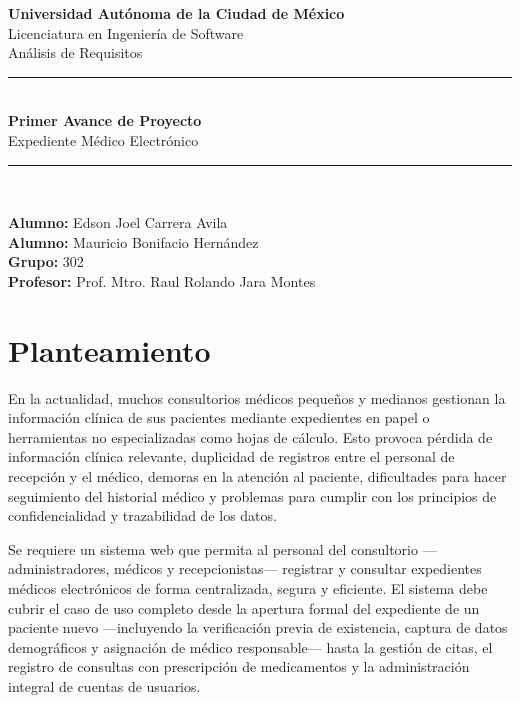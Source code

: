 \documentclass[11pt,a4paper]{article}
\begin{document}
\begin{titlepage}
    \centering
    \vspace*{1.5cm}

    {\Large \textbf{Universidad Autónoma de la Ciudad de México}}\\[0.3cm]
    {\large Licenciatura en Ingeniería de Software}\\[0.2cm]
    {\large Análisis de Requisitos}\\[2.5cm]

    \rule{\linewidth}{0.5pt}\\[0.4cm]
    {\LARGE \bfseries Primer Avance de Proyecto}\\[0.3cm]
    {\Large Expediente Médico Electrónico}\\[0.3cm]
    \rule{\linewidth}{0.5pt}\\[2cm]

    \begin{flushleft}
        \textbf{Alumno:} Edson Joel Carrera Avila \\[0.3cm]
        \textbf{Alumno:} Mauricio Bonifacio Hernández \\[0.3cm]
        \textbf{Grupo:} 302 \\[0.3cm]
        \textbf{Profesor:} Prof. Mtro. Raul Rolando Jara Montes \\[0.3cm]
    \end{flushleft}
    \vfill
\end{titlepage}

\tableofcontents
\newpage

\section{Planteamiento}

En la actualidad, muchos consultorios médicos pequeños y medianos gestionan la información clínica de sus pacientes mediante expedientes en papel o herramientas no especializadas como hojas de cálculo. Esto provoca pérdida de información clínica relevante, duplicidad de registros entre el personal de recepción y el médico, demoras en la atención al paciente, dificultades para hacer seguimiento del historial médico y problemas para cumplir con los principios de confidencialidad y trazabilidad de los datos.

Se requiere un sistema web que permita al personal del consultorio ---administradores, médicos y recepcionistas--- registrar y consultar expedientes médicos electrónicos de forma centralizada, segura y eficiente. El sistema debe cubrir el caso de uso completo desde la apertura formal del expediente de un paciente nuevo ---incluyendo la verificación previa de existencia, captura de datos demográficos y asignación de médico responsable--- hasta la gestión de citas, el registro de consultas con prescripción de medicamentos y la administración integral de cuentas de usuarios.
\end{document}
